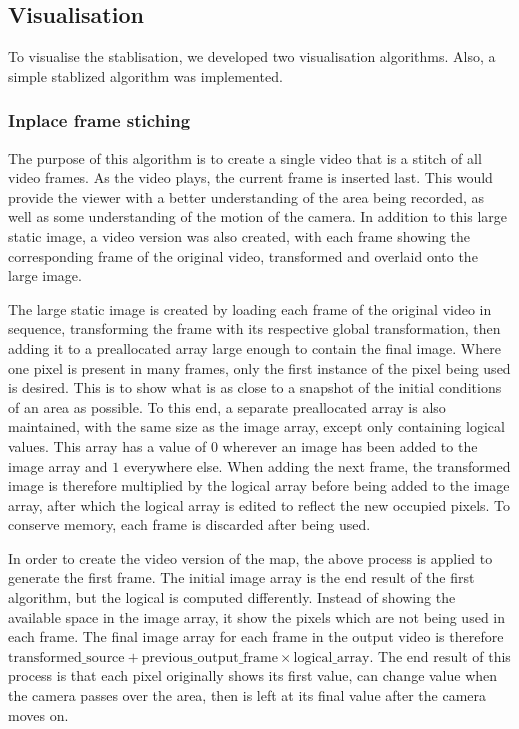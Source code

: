 \subsection{Visualisation}

To visualise the stablisation, we developed two visualisation algorithms.
Also, a simple stablized algorithm was implemented.

\subsubsection{Inplace frame stiching}

The purpose of this algorithm is to create a single video that is a stitch of all video frames.
As the video plays, the current frame is inserted last.
This would provide the viewer with a better understanding of the area being recorded,
as well as some understanding of the motion of the camera.
In addition to this large static image,
a video version was also created,
with each frame showing the corresponding frame of the original video,
transformed and overlaid onto the large image.

The large static image is created by loading each frame of the original video in sequence,
transforming the frame with its respective global transformation,
then adding it to a preallocated array large enough to contain the final image.
Where one pixel is present in many frames, only the first instance of the pixel being used is desired.
This is to show what is as close to a snapshot of the initial conditions of an area as possible.
To this end, a separate preallocated array is also maintained,
with the same size as the image array, except only containing logical values.
This array has a value of $0$ wherever an image has been added to the image array and $1$ everywhere else. 
When adding the next frame,
the transformed image is therefore multiplied by the logical array before being added to the image array,
after which the logical array is edited to reflect the new occupied pixels.
To conserve memory, each frame is discarded after being used.

In order to create the video version of the map,
the above process is applied to generate the first frame.
The initial image array is the end result of the first algorithm, but the logical is computed differently.
Instead of showing the available space in the image array,
it show the pixels which are not being used in each frame.
The final image array for each frame in the output video is therefore
$\text{transformed\_source} + \text{previous\_output\_frame} \times \text{logical\_array}$.
The end result of this process is that each pixel originally shows its first value,
can change value when the camera passes over the area,
then is left at its final value after the camera moves on.

